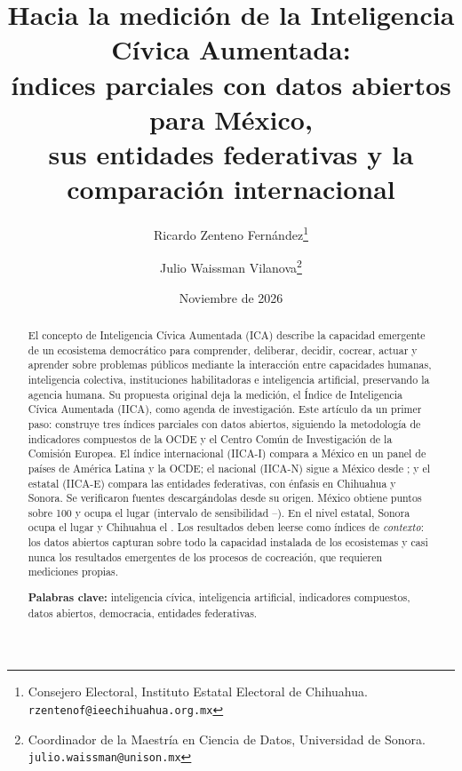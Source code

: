 \documentclass[11pt,a4paper]{article}
\title{\textbf{Hacia la medición de la Inteligencia Cívica Aumentada:\\
índices parciales con datos abiertos para México,\\ sus entidades federativas y la comparación internacional}}
\author{Ricardo Zenteno Fernández\thanks{Consejero Electoral, Instituto Estatal Electoral de Chihuahua. \texttt{rzentenof@ieechihuahua.org.mx}}
\and Julio Waissman Vilanova\thanks{Coordinador de la Maestría en Ciencia de Datos, Universidad de Sonora. \texttt{julio.waissman@unison.mx}}}
\date{Noviembre de 2026}
\begin{document}
\maketitle

\begin{abstract}
\noindent
El concepto de Inteligencia Cívica Aumentada (ICA) describe la capacidad emergente de un ecosistema democrático para comprender, deliberar, decidir, cocrear, actuar y aprender sobre problemas públicos mediante la interacción entre capacidades humanas, inteligencia colectiva, instituciones habilitadoras e inteligencia artificial, preservando la agencia humana. Su propuesta original deja la medición, el Índice de Inteligencia Cívica Aumentada (IICA), como agenda de investigación. Este artículo da un primer paso: construye tres índices parciales con datos abiertos, siguiendo la metodología de indicadores compuestos de la OCDE y el Centro Común de Investigación de la Comisión Europea. El índice internacional (IICA-I) compara a México en un panel de \NPaises{} países de América Latina y la OCDE; el nacional (IICA-N) sigue a México desde \NACdesde; y el estatal (IICA-E) compara las \NEnt{} entidades federativas, con énfasis en Chihuahua y Sonora. Se verificaron \NFuentesVerificadas{} fuentes descargándolas desde su origen. México obtiene \MXindice{} puntos sobre 100 y ocupa el lugar \MXrango{} (intervalo de sensibilidad \MXrangoBajo--\MXrangoAlto). En el nivel estatal, Sonora ocupa el lugar \SONrango{} y Chihuahua el \CHHrango. Los resultados deben leerse como índices de \emph{contexto}: los datos abiertos capturan sobre todo la capacidad instalada de los ecosistemas y casi nunca los resultados emergentes de los procesos de cocreación, que requieren mediciones propias.

\medskip
\noindent\textbf{Palabras clave:} inteligencia cívica, inteligencia artificial, indicadores compuestos, datos abiertos, democracia, entidades federativas.
\end{abstract}
\end{document}
